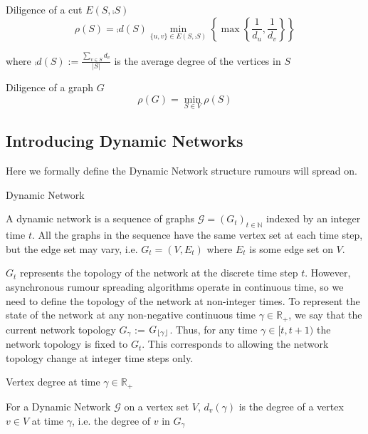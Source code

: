 \begin{definition}
	Diligence of a cut $ E(S, \comp{S}) $
	$$
		\rho(S) = \comp{d}(S) \min_{\{u, v\} \in E(S, \comp{S}) } \left\{ \max \left\{ \frac{1}{d_u},\frac{1}{d_v} \right\} \right\}
	$$ 

	where $\comp{d}(S) := \frac{\sum_{v \in S} d_v}{|S|}$ is the average degree of the vertices in $S$
\end{definition}

\begin{definition}
	Diligence of a graph $G$
	$$
		\rho(G) = \min_{S \in V} \rho(S) 
	$$
\end{definition}

\subsection{Introducing Dynamic Networks}

Here we formally define the Dynamic Network structure rumours will spread on.

\begin{definition}
	Dynamic Network

	\noindent
	A dynamic network is a sequence of graphs $\mathcal{G} = (G_t)_{t \in \mathbb{N}}$ indexed by an integer time $t$. All the graphs in the sequence have the same vertex set at each time step, but the edge set may vary, i.e.  $G_t = (V, E_t)$ where $E_t$ is some edge set on $V$.
\end{definition}

$G_t$ represents the topology of the network at the discrete time step $t$. However, asynchronous rumour spreading algorithms operate in continuous time, so we need to define the topology of the network at non-integer times. To represent the state of the network at any non-negative continuous time $\gamma \in \mathbb{R}_+$, we say that the current network topology $G_\gamma$ := $G_{\lfloor\gamma\rfloor}$. Thus, for any time $\gamma \in [t, t + 1)$ the network topology is fixed to $G_t$. This corresponds to allowing the network topology change at integer time steps only.


\begin{definition}
	Vertex degree at time $\gamma \in \mathbb{R}_+ $ 

	\noindent
	For a Dynamic Network $\mathcal{G}$ on a vertex set $V$, $d_v(\gamma)$ is the degree of a vertex $v \in V$ at time $\gamma$, i.e. the degree of $v$ in $G_\gamma$
\end{definition}


